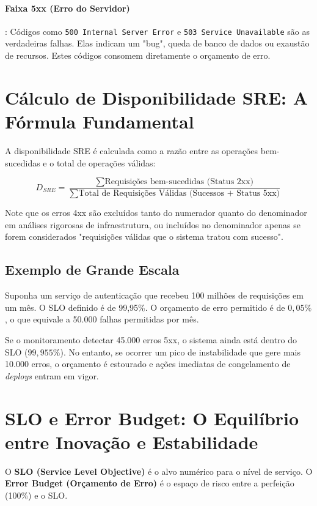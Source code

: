 \documentclass[12pt,a4paper]{report}
\begin{document}
\paragraph{Faixa 5xx (Erro do Servidor)}: Códigos como \texttt{500 Internal Server Error} e \texttt{503 Service Unavailable} são as verdadeiras falhas. Elas indicam um "bug", queda de banco de dados ou exaustão de recursos. Estes códigos consomem diretamente o orçamento de erro.

\section{Cálculo de Disponibilidade SRE: A Fórmula Fundamental}

A disponibilidade SRE é calculada como a razão entre as operações bem-sucedidas e o total de operações válidas:

\begin{equation}
    D_{SRE} = \frac{\sum \text{Requisições bem-sucedidas (Status 2xx)}}{\sum \text{Total de Requisições Válidas (Sucessos + Status 5xx)}}
\end{equation}

Note que os erros 4xx são excluídos tanto do numerador quanto do denominador em análises rigorosas de infraestrutura, ou incluídos no denominador apenas se forem considerados "requisições válidas que o sistema tratou com sucesso".

\subsection{Exemplo de Grande Escala}

Suponha um serviço de autenticação que recebeu 100 milhões de requisições em um mês. O SLO definido é de 99,95\%.
O orçamento de erro permitido é de $0,05\%$, o que equivale a 50.000 falhas permitidas por mês.

Se o monitoramento detectar 45.000 erros 5xx, o sistema ainda está dentro do SLO ($99,955\%$). No entanto, se ocorrer um pico de instabilidade que gere mais 10.000 erros, o orçamento é estourado e ações imediatas de congelamento de \textit{deploys} entram em vigor.

\section{SLO e Error Budget: O Equilíbrio entre Inovação e Estabilidade}

O \textbf{SLO (Service Level Objective)} é o alvo numérico para o nível de serviço. O \textbf{Error Budget (Orçamento de Erro)} é o espaço de risco entre a perfeição (100\%) e o SLO.
\end{document}
